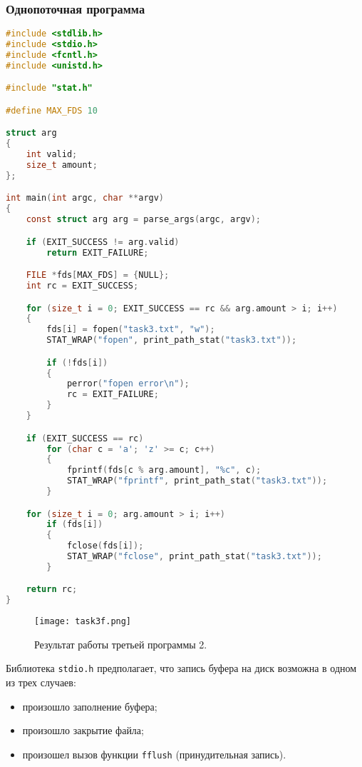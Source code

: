 \subsubsection{Однопоточная программа}

\begin{lstlisting}[language=c, caption={Третья программа 2 (однопоточный вариант)}]
#include <stdlib.h>
#include <stdio.h>
#include <fcntl.h>
#include <unistd.h>

#include "stat.h"

#define MAX_FDS 10

struct arg
{
    int valid;
    size_t amount;
};

int main(int argc, char **argv)
{
    const struct arg arg = parse_args(argc, argv);

    if (EXIT_SUCCESS != arg.valid)
        return EXIT_FAILURE;

    FILE *fds[MAX_FDS] = {NULL};
    int rc = EXIT_SUCCESS;

    for (size_t i = 0; EXIT_SUCCESS == rc && arg.amount > i; i++)
    {
        fds[i] = fopen("task3.txt", "w");
        STAT_WRAP("fopen", print_path_stat("task3.txt"));

        if (!fds[i])
        {
            perror("fopen error\n");
            rc = EXIT_FAILURE;
        }
    }

    if (EXIT_SUCCESS == rc)
        for (char c = 'a'; 'z' >= c; c++)
        {
            fprintf(fds[c % arg.amount], "%c", c);
            STAT_WRAP("fprintf", print_path_stat("task3.txt"));
        }

    for (size_t i = 0; arg.amount > i; i++)
        if (fds[i])
        {
            fclose(fds[i]);
            STAT_WRAP("fclose", print_path_stat("task3.txt"));
        }

    return rc;
}
\end{lstlisting}

\begin{figure}[h]
    \centering
    \texttt{[image: task3f.png]}
    \caption{Результат работы третьей программы 2.}
\end{figure}

Библиотека \verb|stdio.h| предполагает, что запись буфера на диск возможна
в одном из трех случаев:
\begin{itemize}
    \item произошло заполнение буфера;
    \item произошло закрытие файла;
    \item произошел вызов функции \verb|fflush| (принудительная запись).
\end{itemize}


